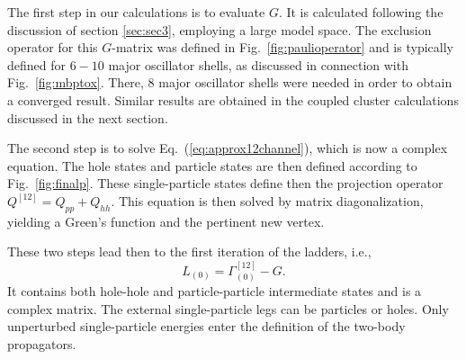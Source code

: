 \documentclass{article}
\begin{document}
The first step in our calculations is to evaluate $G$.  It is 
calculated following the discussion of section \ref{sec:sec3}, employing a
large model space.
The exclusion operator for this $G$-matrix was defined in
Fig.~\ref{fig:paulioperator} and is typically defined for $6-10$ major oscillator shells,
as discussed in connection with Fig.~\ref{fig:mbptox}. There, 8 major oscillator shells
were needed in order to obtain a converged result. Similar results are obtained
in the coupled cluster calculations discussed in the next section.

The second step is to solve Eq.\ (\ref{eq:approx12channel}),
which is now a complex equation. 
The hole states and particle states are then defined according to Fig.~\ref{fig:finalp}.
These single-particle states define then the projection operator  $Q^{[12]}=Q_{pp}+Q_{hh}$.
This equation is then solved by matrix diagonalization, yielding a Green's function and the 
pertinent new vertex.

These two steps lead then to the first iteration of
the ladders, i.e.,
\begin{equation}
     L_{(0)}=\Gamma^{[12]}_{(0)}-G.
\end{equation} 
It contains both hole-hole and particle-particle intermediate
states and is a complex matrix. The external single-particle
legs can be particles or holes. Only unperturbed single-particle 
energies enter the definition of the two-body propagators.
\end{document}

